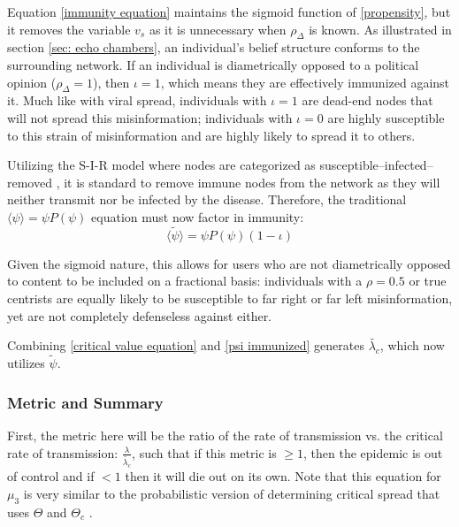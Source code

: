 \documentclass[preprint,review,12pt]{elsarticle}
\begin{document}
Equation \ref{immunity equation} maintains the sigmoid function of \ref{propensity}, but it removes the variable $v_s$ as it is unnecessary when $\rho_{\Delta}$ is known. As illustrated in section \ref{sec: echo chambers}, an individual's belief structure conforms to the surrounding network. If an individual is diametrically opposed to a political opinion ($\rho_{\Delta} = 1$), then $\iota = 1$, which means they are effectively immunized against it. Much like with viral spread, individuals with $\iota = 1$ are dead-end nodes that will not spread this misinformation; individuals with $\iota = 0$ are highly susceptible to this strain of misinformation and are highly likely to spread it to others.

Utilizing the S-I-R model where nodes are categorized as susceptible–infected–removed \cite{ferrari2006network,bailey1975mathematical,newman2005threshold,newman2002spread}, it is standard to remove immune nodes from the network as they will neither transmit nor be infected by the disease. Therefore, the traditional $\langle \psi \rangle = \psi P(\psi)$ equation must now factor in immunity:
\begin{equation}
\label{psi immunized}
 \langle \tilde{\psi} \rangle =  \psi P(\psi)(1-\iota)
\end{equation}

Given the sigmoid nature, this allows for users who are not diametrically opposed to content to be included on a fractional basis: individuals with a $\rho = 0.5$ or true centrists are equally likely to be susceptible to far right or far left misinformation, yet are not completely defenseless against either.

Combining \ref{critical value equation} and \ref{psi immunized} generates $\tilde{\lambda_c}$, which now utilizes $\tilde{\psi}$.

\subsubsection{Metric and Summary}
First, the metric here will be the ratio of the rate of transmission vs. the critical rate of transmission: $\frac{\lambda}{\tilde{\lambda_c}}$, such that if this metric is $\geq 1$, then the epidemic is out of control and if $< 1$ then it will die out on its own. Note that this equation for $\mu_3$ is very similar to the probabilistic version of determining critical spread that uses $\Theta$ and $\Theta_c$ \cite{newman2005threshold,ferrari2006network,meyers2005network,callaway2000network,newman2002random}.
\end{document}

